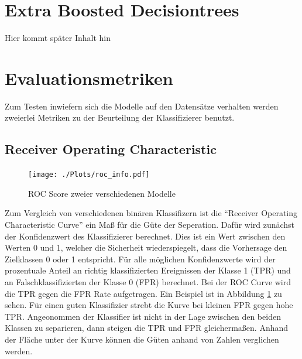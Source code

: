 \section{Extra Boosted Decisiontrees}
Hier kommt später Inhalt hin
\section{Evaluationsmetriken}
Zum Testen inwiefern sich die Modelle auf den Datensätze verhalten werden zweierlei Metriken zu der Beurteilung der Klassifizierer benutzt.
\subsection*{Receiver Operating Characteristic}
\begin{figure}
  \centering
  \texttt{[image: ./Plots/roc\_info.pdf]}
  \caption{ROC Score zweier verschiedenen Modelle}
  \label{fig:roc}
\end{figure}
Zum Vergleich von verschiedenen binären Klassifizern ist die ``Receiver Operating Characteristic Curve'' ein Maß für die Güte der Seperation. 
Dafür wird zunächst der Konfidenzwert des Klassifizierer berechnet. 
Dies ist ein Wert zwischen den Werten 0 und 1, welcher die Sicherheit wiederspiegelt, dass die Vorhersage den Zielklassen 0 oder 1 entspricht.
Für alle möglichen Konfidenzwerte wird der prozentuale Anteil an richtig klassifizierten Ereignissen der Klasse 1 (TPR) und an Falschklassifizierten der Klasse 0 (FPR) berechnet. 
Bei der ROC Curve wird die TPR gegen die FPR Rate aufgetragen. 
Ein Beispiel ist in Abbildung \ref{fig:roc} zu sehen.
Für einen guten Klassifizier strebt die Kurve bei kleinen FPR gegen hohe TPR. 
Angeonommen der Klassifier ist nicht in der Lage zwischen den beiden Klassen zu separieren, dann steigen die TPR und FPR gleichermaßen. 
Anhand der Fläche unter der Kurve können die Güten anhand von Zahlen verglichen werden.

